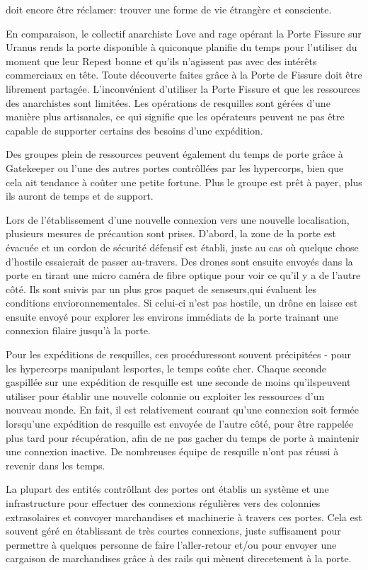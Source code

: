{doit encore être réclamer: trouver une forme de vie étrangère et consciente. 

En comparaison, le collectif anarchiste Love and rage opérant la Porte Fissure sur Uranus rends la porte disponible à quiconque planifie du temps pour l'utiliser du moment que leur Repest bonne et qu'ils n'agissent pas avec des intérêts commerciaux en tête. Toute découverte faites grâce à la Porte de Fissure doit être librement partagée. L'inconvénient d'utiliser la Porte Fissure et que les ressources des anarchistes sont limitées. Les opérations de resquilles sont gérées d'une manière plus artisanales, ce qui signifie que les opérateurs peuvent ne pas être capable de supporter certains des besoins d'une expédition. 

Des groupes plein de ressources peuvent également du temps de porte grâce à Gatekeeper ou l'une des autres portes contrôllées par les hypercorps, bien que cela ait tendance à coûter une petite fortune. Plus le groupe est prêt à payer, plus ils auront de temps et de support. 

Lors de l'établissement d'une nouvelle connexion vers une nouvelle localisation, plusieurs mesures de précaution sont prises. D'abord, la zone de la porte est évacuée et un cordon de sécurité défensif est établi, juste au cas où quelque chose d'hostile essaierait de passer au-travers. Des drones sont ensuite envoyés dans la porte en tirant une micro caméra de fibre optique pour voir ce qu'il y a de l'autre côté. Ils sont suivis par un plus gros paquet de senseurs,qui évaluent les conditions envioronnementales. Si celui-ci n'est pas hostile, un drône en laisse est ensuite envoyé pour explorer les environs immédiats de la porte trainant une connexion filaire jusqu'à la porte. 

Pour les expéditions de resquilles, ces procéduressont souvent précipitées - pour les hypercorps manipulant lesportes, le temps coûte cher. Chaque seconde gaspillée sur une expédition de resquille est une seconde de moins qu'ilspeuvent utiliser pour établir une nouvelle colonnie ou exploiter les ressources d'un nouveau monde. En fait, il est relativement courant qu'une connexion soit fermée lorsqu'une expédition de resquille est envoyée de l'autre côté, pour être rappelée plus tard pour récupération, afin de ne pas gacher du temps de porte à maintenir une connexion inactive. De nombreuses équipe de resquille n'ont pas réussi à revenir dans les temps. 

La plupart des entités contrôllant des portes ont établis un système et une infrastructure pour effectuer des connexions régulières vers des colonnies extrasolaires et convoyer marchandises et machinerie à travers ces portes.  Cela est souvent géré en établissant de très courtes connexions, juste suffisament pour permettre à quelques personne de faire l'aller-retour et/ou pour envoyer une cargaison de marchandises grâce à des rails qui mènent direcetement à la porte. 

}

